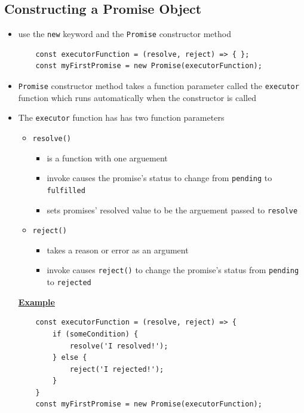 \documentclass[12pt]{article}
\begin{document}
\subsection{Constructing a Promise Object}
\begin{itemize}
    \item use the \texttt{new} keyword and the \texttt{Promise} constructor method

    \begin{lstlisting}
    const executorFunction = (resolve, reject) => { };
    const myFirstPromise = new Promise(executorFunction);
    \end{lstlisting}

    \item \texttt{Promise} constructor method takes a function parameter called the
    \texttt{executor} function which runs automatically when the constructor is called

    \item The \texttt{executor} function has has two function parameters
    \begin{itemize}
        \item \texttt{resolve()}
        \begin{itemize}
            \item is a function with one arguement
            \item invoke causes the promise's status to change from \texttt{pending} to \texttt{fulfilled}
            \item sets promises' resolved value to be the arguement passed to \texttt{resolve}
        \end{itemize}
        \item \texttt{reject()}
        \begin{itemize}
            \item takes a reason or error as an argument
            \item invoke causes \texttt{reject()} to change the promise’s status from \texttt{pending} to \texttt{rejected}
        \end{itemize}
    \end{itemize}

    \bigskip

    \underline{\textbf{Example}}

    \begin{lstlisting}
    const executorFunction = (resolve, reject) => {
        if (someCondition) {
            resolve('I resolved!');
        } else {
            reject('I rejected!');
        }
    }
    const myFirstPromise = new Promise(executorFunction);
    \end{lstlisting}

\end{itemize}
\end{document}
